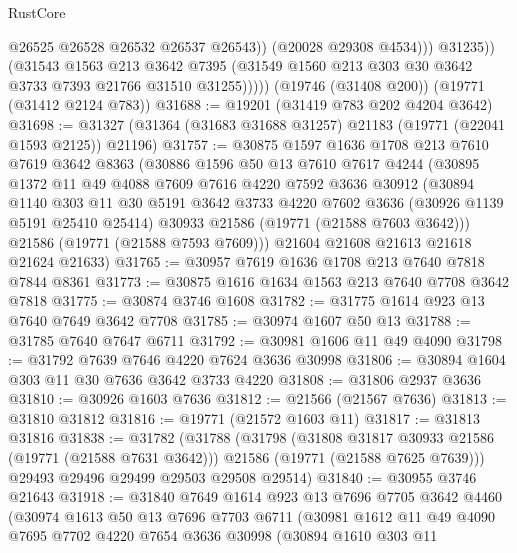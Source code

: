 \begin{lexlean}{RustCore}
\begin{coremodule}
                      @26525
                      @26528
                      @26532
                      @26537
                      @26543))
                  (@20028 @29308 @4534)))
              @31235))
          (@31543
            @1563
            @213
            @3642
            @7395
            (@31549 @1560 @213 @303 @30 @3642 @3733 @7393 @21766 @31510 @31255)))))
    (@19746 (@31408 @200))
    (@19771 (@31412 @2124 @783))
@31688 := @19201 (@31419 @783 @202 @4204 @3642)
@31698 := @31327 (@31364 (@31683 @31688 @31257) @21183 (@19771 (@22041 @1593 @2125)) @21196)
@31757 := @30875
    @1597
    @1636
    @1708
    @213
    @7610
    @7619
    @3642
    @8363
    (@30886
      @1596
      @50
      @13
      @7610
      @7617
      @4244
      (@30895
        @1372
        @11
        @49
        @4088
        @7609
        @7616
        @4220
        @7592
        @3636
        @30912
        (@30894
          @1140
          @303
          @11
          @30
          @5191
          @3642
          @3733
          @4220
          @7602
          @3636
          (@30926 @1139 @5191 @25410 @25414)
          @30933
          @21586
          (@19771 (@21588 @7603 @3642)))
        @21586
        (@19771 (@21588 @7593 @7609)))
      @21604
      @21608
      @21613
      @21618
      @21624
      @21633)
@31765 := @30957 @7619 @1636 @1708 @213 @7640 @7818 @7844 @8361
@31773 := @30875 @1616 @1634 @1563 @213 @7640 @7708 @3642 @7818
@31775 := @30874 @3746 @1608
@31782 := @31775 @1614 @923 @13 @7640 @7649 @3642 @7708
@31785 := @30974 @1607 @50 @13
@31788 := @31785 @7640 @7647 @6711
@31792 := @30981 @1606 @11 @49 @4090
@31798 := @31792 @7639 @7646 @4220 @7624 @3636 @30998
@31806 := @30894 @1604 @303 @11 @30 @7636 @3642 @3733 @4220
@31808 := @31806 @2937 @3636
@31810 := @30926 @1603 @7636
@31812 := @21566 (@21567 @7636)
@31813 := @31810 @31812
@31816 := @19771 (@21572 @1603 @11)
@31817 := @31813 @31816
@31838 := @31782
    (@31788
      (@31798
        (@31808 @31817 @30933 @21586 (@19771 (@21588 @7631 @3642)))
        @21586
        (@19771 (@21588 @7625 @7639)))
      @29493
      @29496
      @29499
      @29503
      @29508
      @29514)
@31840 := @30955 @3746 @21643
@31918 := @31840
    @7649
    @1614
    @923
    @13
    @7696
    @7705
    @3642
    @4460
    (@30974
      @1613
      @50
      @13
      @7696
      @7703
      @6711
      (@30981
        @1612
        @11
        @49
        @4090
        @7695
        @7702
        @4220
        @7654
        @3636
        @30998
        (@30894
          @1610
          @303
          @11

\end{coremodule}
\end{lexlean}
